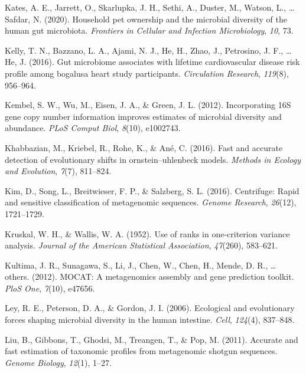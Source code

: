 \documentclass[12pt,a4paper]{reedthesis}
\theoremstyle{definition}
\theoremstyle{definition}
\theoremstyle{definition}
\theoremstyle{remark}
\begin{document}
\leavevmode\hypertarget{ref-kates2020household}{}%
Kates, A. E., Jarrett, O., Skarlupka, J. H., Sethi, A., Duster, M., Watson, L., \ldots{} Safdar, N. (2020). Household pet ownership and the microbial diversity of the human gut microbiota. \emph{Frontiers in Cellular and Infection Microbiology}, \emph{10}, 73.

\leavevmode\hypertarget{ref-kelly2016gut}{}%
Kelly, T. N., Bazzano, L. A., Ajami, N. J., He, H., Zhao, J., Petrosino, J. F., \ldots{} He, J. (2016). Gut microbiome associates with lifetime cardiovascular disease risk profile among bogalusa heart study participants. \emph{Circulation Research}, \emph{119}(8), 956--964.

\leavevmode\hypertarget{ref-kembel2012incorporating}{}%
Kembel, S. W., Wu, M., Eisen, J. A., \& Green, J. L. (2012). Incorporating 16S gene copy number information improves estimates of microbial diversity and abundance. \emph{PLoS Comput Biol}, \emph{8}(10), e1002743.

\leavevmode\hypertarget{ref-khabbazian2016fast}{}%
Khabbazian, M., Kriebel, R., Rohe, K., \& Ané, C. (2016). Fast and accurate detection of evolutionary shifts in ornstein--uhlenbeck models. \emph{Methods in Ecology and Evolution}, \emph{7}(7), 811--824.

\leavevmode\hypertarget{ref-kim2016centrifuge}{}%
Kim, D., Song, L., Breitwieser, F. P., \& Salzberg, S. L. (2016). Centrifuge: Rapid and sensitive classification of metagenomic sequences. \emph{Genome Research}, \emph{26}(12), 1721--1729.

\leavevmode\hypertarget{ref-kruskal1952use}{}%
Kruskal, W. H., \& Wallis, W. A. (1952). Use of ranks in one-criterion variance analysis. \emph{Journal of the American Statistical Association}, \emph{47}(260), 583--621.

\leavevmode\hypertarget{ref-kultima2012mocat}{}%
Kultima, J. R., Sunagawa, S., Li, J., Chen, W., Chen, H., Mende, D. R., \ldots{} others. (2012). MOCAT: A metagenomics assembly and gene prediction toolkit. \emph{PloS One}, \emph{7}(10), e47656.

\leavevmode\hypertarget{ref-ley2006ecological}{}%
Ley, R. E., Peterson, D. A., \& Gordon, J. I. (2006). Ecological and evolutionary forces shaping microbial diversity in the human intestine. \emph{Cell}, \emph{124}(4), 837--848.

\leavevmode\hypertarget{ref-liu2011accurate}{}%
Liu, B., Gibbons, T., Ghodsi, M., Treangen, T., \& Pop, M. (2011). Accurate and fast estimation of taxonomic profiles from metagenomic shotgun sequences. \emph{Genome Biology}, \emph{12}(1), 1--27.
\end{document}
